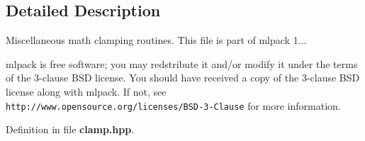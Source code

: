 \subsection{Detailed Description}
Miscellaneous math clamping routines. This file is part of mlpack 1...

mlpack is free software; you may redstribute it and/or modify it under the terms of the 3-\/clause B\-S\-D license. You should have received a copy of the 3-\/clause B\-S\-D license along with mlpack. If not, see {\tt http\-://www.\-opensource.\-org/licenses/\-B\-S\-D-\/3-\/\-Clause} for more information. 

Definition in file {\bf clamp.\-hpp}.

